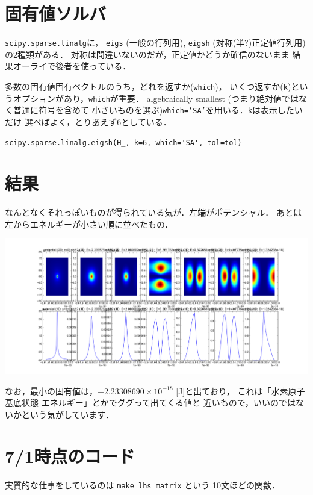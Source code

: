 \documentclass[dvipdfmx]{article}
\begin{document}
\section{固有値ソルバ}
{\tt scipy.sparse.linalg}に，
{\tt eigs} (一般の行列用), 
{\tt eigsh} (対称(半?)正定値行列用)の2種類がある．
対称は間違いないのだが，正定値かどうか確信のないまま
結果オーライで後者を使っている．

多数の固有値固有ベクトルのうち，どれを返すか({\tt which})，
いくつ返すか({\tt k})というオプションがあり，{\tt which}が重要．
algebraically smallest (つまり絶対値ではなく普通に符号を含めて
小さいものを選ぶ){\tt which='SA'}を用いる．{\tt k}は表示したいだけ
選べばよく，とりあえず6としている．

\begin{lstlisting}
scipy.sparse.linalg.eigsh(H_, k=6, which='SA', tol=tol)
\end{lstlisting}

\section{結果}
なんとなくそれっぽいものが得られている気が．左端がポテンシャル．
あとは左からエネルギーが小さい順に並べたもの．

\includegraphics[width=\textwidth]{out/pdf/img/hydrogen_80.pdf}

なお，最小の固有値は，$-2.23308690\times 10^{-18}$ [J]と出ており，
これは「水素原子 基底状態 エネルギー」とかでググって出てくる値と
近いもので，いいのではないかという気がしています．

\appendix

\section{7/1時点のコード}
実質的な仕事をしているのは {\tt make\_lhs\_matrix}
という 10文ほどの関数．


\end{document}
